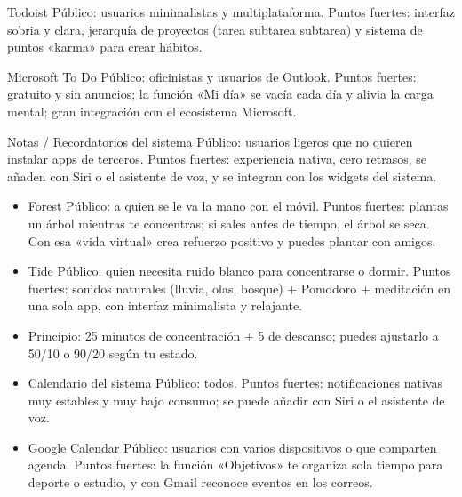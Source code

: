 Todoist Público: usuarios minimalistas y multiplataforma. Puntos fuertes: interfaz sobria y clara, jerarquía de proyectos (tarea subtarea subtarea) y sistema de puntos «karma» para crear hábitos.

Microsoft To Do Público: oficinistas y usuarios de Outlook. Puntos fuertes: gratuito y sin anuncios; la función «Mi día» se vacía cada día y alivia la carga mental; gran integración con el ecosistema Microsoft.

Notas / Recordatorios del sistema Público: usuarios ligeros que no quieren instalar apps de terceros. Puntos fuertes: experiencia nativa, cero retrasos, se añaden con Siri o el asistente de voz, y se integran con los widgets del sistema.


\begin{itemize}
  \item Forest Público: a quien se le va la mano con el móvil. Puntos fuertes: plantas un árbol mientras te concentras; si sales antes de tiempo, el árbol se seca. Con esa «vida virtual» crea refuerzo positivo y puedes plantar con amigos.
  \item Tide Público: quien necesita ruido blanco para concentrarse o dormir. Puntos fuertes: sonidos naturales (lluvia, olas, bosque) + Pomodoro + meditación en una sola app, con interfaz minimalista y relajante.
  \item Principio: 25 minutos de concentración + 5 de descanso; puedes ajustarlo a 50/10 o 90/20 según tu estado.
\end{itemize}


\begin{itemize}
  \item Calendario del sistema Público: todos. Puntos fuertes: notificaciones nativas muy estables y muy bajo consumo; se puede añadir con Siri o el asistente de voz.
  \item Google Calendar Público: usuarios con varios dispositivos o que comparten agenda. Puntos fuertes: la función «Objetivos» te organiza sola tiempo para deporte o estudio, y con Gmail reconoce eventos en los correos.
\end{itemize}


